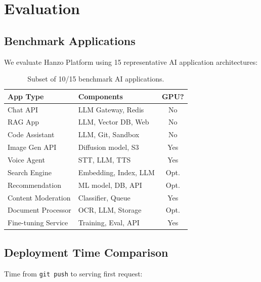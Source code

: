 \section{Evaluation}

\label{sec:evaluation}

\subsection{Benchmark Applications}

We evaluate Hanzo Platform using 15 representative AI application architectures:

\begin{table}[H]
\centering
\small
\begin{tabular}{llc}
\toprule
\textbf{App Type} & \textbf{Components} & \textbf{GPU?} \\
\midrule
Chat API & LLM Gateway, Redis & No \\
RAG App & LLM, Vector DB, Web & No \\
Code Assistant & LLM, Git, Sandbox & No \\
Image Gen API & Diffusion model, S3 & Yes \\
Voice Agent & STT, LLM, TTS & Yes \\
Search Engine & Embedding, Index, LLM & Opt. \\
Recommendation & ML model, DB, API & Opt. \\
Content Moderation & Classifier, Queue & Yes \\
Document Processor & OCR, LLM, Storage & Opt. \\
Fine-tuning Service & Training, Eval, API & Yes \\
\bottomrule
\end{tabular}
\caption{Subset of 10/15 benchmark AI applications.}
\label{tab:apps}
\end{table}

\subsection{Deployment Time Comparison}

Time from \texttt{git push} to serving first request:

